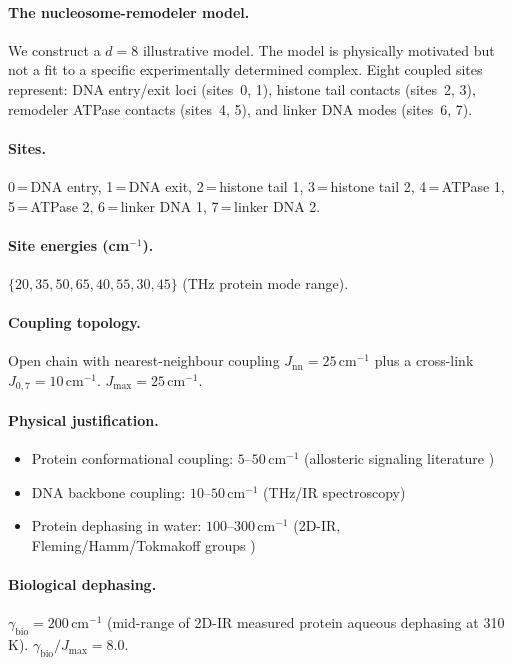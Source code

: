 \documentclass[12pt,a4paper]{article}
\theoremstyle{definition}
\theoremstyle{remark}
\begin{document}
\paragraph{The nucleosome-remodeler model.}
We construct a $d = 8$ illustrative model. The model is physically motivated but not a fit to a specific experimentally determined complex. Eight coupled sites represent: DNA entry/exit loci (sites~0, 1), histone tail contacts (sites~2, 3), remodeler ATPase contacts (sites~4, 5), and linker DNA modes (sites~6, 7).

\paragraph{Sites.} 0\,=\,DNA entry, 1\,=\,DNA exit, 2\,=\,histone tail 1, 3\,=\,histone tail 2, 4\,=\,ATPase 1, 5\,=\,ATPase 2, 6\,=\,linker DNA 1, 7\,=\,linker DNA 2.

\paragraph{Site energies (cm$^{-1}$).} $\{20, 35, 50, 65, 40, 55, 30, 45\}$ (THz protein mode range).

\paragraph{Coupling topology.} Open chain with nearest-neighbour coupling $J_{\mathrm{nn}} = 25$\,cm$^{-1}$ plus a cross-link $J_{0,7} = 10$\,cm$^{-1}$. $J_{\max} = 25$\,cm$^{-1}$.

\paragraph{Physical justification.}
\begin{itemize}
\item Protein conformational coupling: $5$--$50$\,cm$^{-1}$ (allosteric signaling literature \cite{clapier2009chromatin})
\item DNA backbone coupling: $10$--$50$\,cm$^{-1}$ (THz/IR spectroscopy)
\item Protein dephasing in water: $100$--$300$\,cm$^{-1}$ (2D-IR, Fleming/Hamm/Tokmakoff groups \cite{hamm2011concepts})
\end{itemize}

\paragraph{Biological dephasing.} $\gamma_{\mathrm{bio}} = 200$\,cm$^{-1}$ (mid-range of 2D-IR measured protein aqueous dephasing at 310\,K). $\gamma_{\mathrm{bio}}/J_{\max} = 8.0$.
\end{document}
